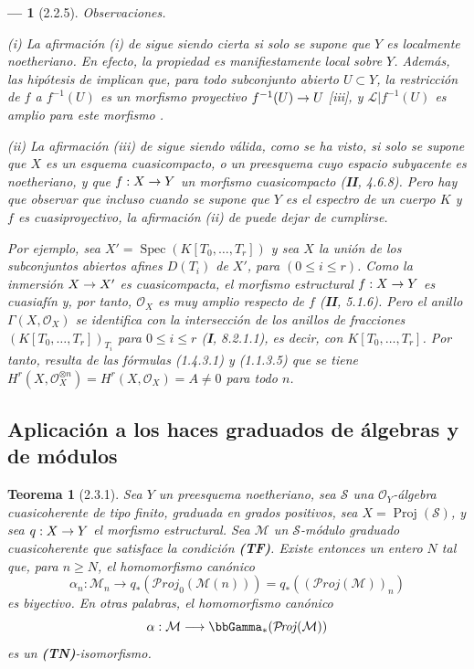 \documentclass[10pt,oneside,openany]{book}
\theoremstyle{egaenv}\newtheorem*{env}{---}
\theoremstyle{egastatement}
\newtheorem*{theorem}{Teorema}
\theoremstyle{egadescription}
\newcommand{\oldpage}[2][]{\marginnote{\normalfont\scriptsize\textbf{#1}\,|\,#2}\ignorespaces}
\providecommand{\shProj}{\mathcal{P}\!\mathit{roj}}
\renewcommand{\leq}{\leqslant}
\renewcommand{\geq}{\geqslant}
\renewcommand{\to}{\mathchoice{\longrightarrow}{\rightarrow}{\rightarrow}{\rightarrow}}
\begin{document}
\begin{env}[2.2.5]
\label{III.2.2.5}
\label{III.2.2.5-fr}
\emph{Observaciones.}

(i) La afirmación (i) de  sigue siendo cierta si solo se supone que $Y$ es \emph{localmente noetheriano}.
En efecto, la propiedad es manifiestamente local sobre $Y$.
Además, las hipótesis de  implican que, para todo subconjunto abierto $U\subset Y$, la restricción de $f$ a $f^{-1}(U)$ es un morfismo proyectivo
$f^{-1}(U)\to U$
[iii], y $\mathcal L|f^{-1}(U)$ es amplio para este morfismo .

(ii) La afirmación (iii) de  sigue siendo válida, como se ha visto, si solo se supone que $X$ es un esquema cuasicompacto, o un preesquema cuyo espacio subyacente es noetheriano, y que $f:X\to Y$ un morfismo cuasicompacto (\textbf{II}, 4.6.8). Pero hay que observar que incluso cuando se supone que $Y$ es el \emph{espectro de un cuerpo} $K$ y $f$ es \emph{cuasiproyectivo}, la afirmación (ii) de  puede dejar de cumplirse.

Por ejemplo, sea
$X'=\operatorname{Spec}(K[T_0,\ldots,T_r])$
y sea $X$ la unión de los subconjuntos abiertos afines $D(T_i)$ de $X'$, para $(0\leq i\leq r)$.
Como la inmersión $X\to X'$ es cuasicompacta, el morfismo estructural $f:X\to Y$ es cuasiafín  y, por tanto, $\mathcal O_X$ es muy amplio respecto de $f$ (\textbf{II}, 5.1.6). Pero el anillo
$\Gamma(X,\mathcal O_X)$ se identifica con la intersección de los anillos de
fracciones $(K[T_0,\ldots,T_r])_{T_i}$ para $0\leq i\leq r$
(\textbf{I}, 8.2.1.1), es decir, con $K[T_0,\ldots,T_r]$. Por tanto, resulta
de las fórmulas (1.4.3.1) y (1.1.3.5) que se tiene
$H^r(X,\mathcal O_X^{\otimes n})=H^r(X,\mathcal O_X)=A\neq0$
para todo $n$.
\end{env}


\subsection{Aplicación a los haces graduados de álgebras y de módulos}
\label{subsection:III.2.3}
\label{subsection:III.2.3-fr}

\begin{theorem}[2.3.1]
\label{III.2.3.1}
\label{III.2.3.1-fr}
Sea $Y$ un preesquema noetheriano, sea $\mathcal S$ una $\mathcal O_Y$-álgebra cuasicoherente de tipo finito, graduada en grados positivos, sea
$X=\operatorname{Proj}(\mathcal S)$,
y sea $q:X\to Y$ el morfismo estructural.
Sea $\mathcal M$ un $\mathcal S$-módulo graduado cuasicoherente que satisface la condición \textup{\textbf{(TF)}}.
Existe entonces un entero $N$ tal que, para $n\geq N$, el homomorfismo canónico \textup{}
\[
\alpha_n:\mathcal M_n\longrightarrow
q_*(\shProj_0(\mathcal M(n)))
=q_*((\shProj(\mathcal M))_n)
\]
\oldpage[III]{103}
es biyectivo.
En otras palabras, el homomorfismo canónico
\[
\alpha:\mathcal M\longrightarrow\bbGamma_*(\shProj(\mathcal M))
\]
es un \textup{\textbf{(TN)}}-isomorfismo.
\end{theorem}
\end{document}
